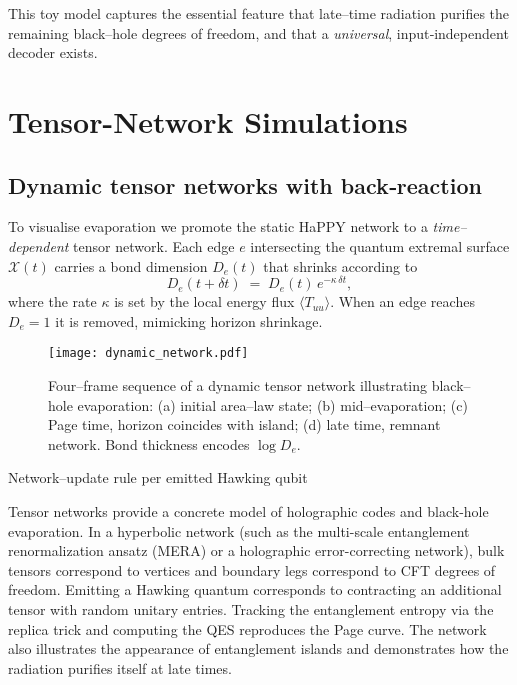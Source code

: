 \documentclass[12pt]{article}
\begin{document}
This toy model captures the essential feature that late--time radiation purifies the remaining black--hole degrees of freedom, and that a \emph{universal}, input‐independent decoder exists.
\section{Tensor-Network Simulations}
\subsection{Dynamic tensor networks with back‑reaction}
\label{subsec:dynamicTN}

To visualise evaporation we promote the static HaPPY network to a \emph{time--dependent} tensor network.  Each edge $e$ intersecting the quantum extremal surface $\mathcal{X}(t)$ carries a bond dimension $D_e(t)$ that shrinks according to
\begin{equation}
  D_e(t+\delta t) \;=\; D_e(t)\,e^{-\kappa\,\delta t},
\end{equation}
where the rate $\kappa$ is set by the local energy flux $\langle T_{uu}\rangle$.  When an edge reaches $D_e=1$ it is removed, mimicking horizon shrinkage.

\begin{figure}[t]
  \centering
  \texttt{[image: dynamic\_network.pdf]}
  \caption{Four--frame sequence of a dynamic tensor network illustrating black--hole evaporation: (a) initial area--law state; (b) mid--evaporation; (c) Page time, horizon coincides with island; (d) late time, remnant network.  Bond thickness encodes $\log D_e$.}
  \label{fig:dynamicTN}
\end{figure}

\begin{algorithm}[H]
\caption{Network--update rule per emitted Hawking qubit}
\end{algorithm}

Tensor networks provide a concrete model of holographic codes and black-hole evaporation.  In a hyperbolic network (such as the multi-scale entanglement renormalization ansatz (MERA) or a holographic error-correcting network), bulk tensors correspond to vertices and boundary legs correspond to CFT degrees of freedom.  Emitting a Hawking quantum corresponds to contracting an additional tensor with random unitary entries.  Tracking the entanglement entropy via the replica trick and computing the QES reproduces the Page curve.  The network also illustrates the appearance of entanglement islands and demonstrates how the radiation purifies itself at late times.
\end{document}
